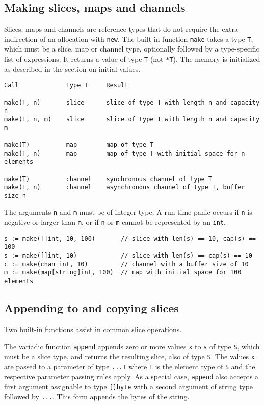 \subsection*{Making slices, maps and channels}

Slices, maps and channels are reference types that do not require the
extra indirection of an allocation with \texttt{new}. The built-in
function \texttt{make} takes a type \texttt{T}, which must be a slice,
map or channel type, optionally followed by a type-specific list of
expressions. It returns a value of type \texttt{T} (not \texttt{*T}).
The memory is initialized as described in the section on initial values.

\begin{Verbatim}[frame=single]
Call             Type T     Result

make(T, n)       slice      slice of type T with length n and capacity n
make(T, n, m)    slice      slice of type T with length n and capacity m

make(T)          map        map of type T
make(T, n)       map        map of type T with initial space for n elements

make(T)          channel    synchronous channel of type T
make(T, n)       channel    asynchronous channel of type T, buffer size n
\end{Verbatim}

The arguments \texttt{n} and \texttt{m} must be of integer type. A
run-time panic occurs if \texttt{n} is
negative or larger than \texttt{m}, or if \texttt{n} or \texttt{m}
cannot be represented by an \texttt{int}.

\begin{Verbatim}[frame=single]
s := make([]int, 10, 100)       // slice with len(s) == 10, cap(s) == 100
s := make([]int, 10)            // slice with len(s) == cap(s) == 10
c := make(chan int, 10)         // channel with a buffer size of 10
m := make(map[string]int, 100)  // map with initial space for 100 elements
\end{Verbatim}

\subsection*{Appending to and copying slices}

Two built-in functions assist in common slice operations.

The variadic function \texttt{append} appends zero or more values
\texttt{x} to \texttt{s} of type \texttt{S}, which must be a slice
type, and returns the resulting slice, also of type \texttt{S}. The
values \texttt{x} are passed to a parameter of type \texttt{...T}
where \texttt{T} is the element type of \texttt{S} and the respective
parameter passing rules apply. As a special case, \texttt{append}
also accepts a first argument assignable to type \texttt{{[}{]}byte}
with a second argument of string type followed by \texttt{...}.
This form appends the bytes of the string.

